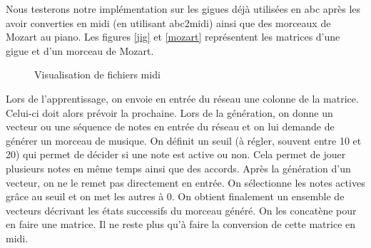 Nous testerons notre implémentation sur les gigues déjà utilisées en abc après les avoir converties en midi (en utilisant abc2midi) ainsi que des morceaux de Mozart au piano. Les figures \ref{jig} et \ref{mozart} représentent les matrices d'une gigue et d'un morceau de Mozart.

\begin{figure}[!h]
  \centering
  \hfill
  \caption{Visualisation de fichiers midi}
\end{figure}

Lors de l'apprentissage, on envoie en entrée du réseau une colonne de la matrice. Celui-ci doit alors prévoir la prochaine. Lors de la génération, on donne un vecteur ou une séquence de notes en entrée du réseau et on lui demande de générer un morceau de musique. On définit un seuil (à régler, souvent entre 10 et 20) qui permet de décider si une note est active ou non. Cela permet de jouer plusieurs notes en même temps ainsi que des accords. Après la génération d'un vecteur, on ne le remet pas directement en entrée. On sélectionne les notes actives grâce au seuil et on met les autres à 0. On obtient finalement un ensemble de vecteurs décrivant les états successifs du morceau généré. On les concatène pour en faire une matrice. Il ne reste plus qu'à faire la conversion de cette matrice en midi.


